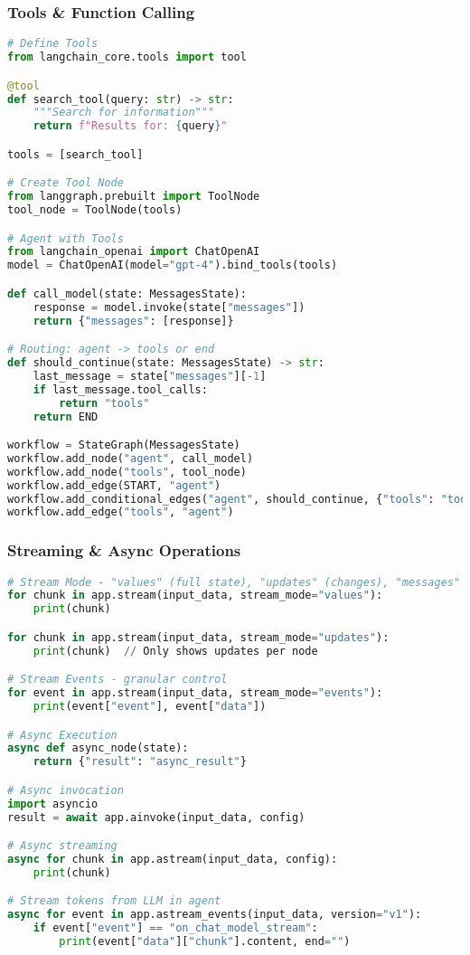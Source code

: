 \begin{frame}[fragile]\frametitle{Tools \& Function Calling}
      \begin{lstlisting}[language=python,basicstyle=\tiny]
# Define Tools
from langchain_core.tools import tool

@tool
def search_tool(query: str) -> str:
    """Search for information"""
    return f"Results for: {query}"

tools = [search_tool]

# Create Tool Node
from langgraph.prebuilt import ToolNode
tool_node = ToolNode(tools)

# Agent with Tools
from langchain_openai import ChatOpenAI
model = ChatOpenAI(model="gpt-4").bind_tools(tools)

def call_model(state: MessagesState):
    response = model.invoke(state["messages"])
    return {"messages": [response]}

# Routing: agent -> tools or end
def should_continue(state: MessagesState) -> str:
    last_message = state["messages"][-1]
    if last_message.tool_calls:
        return "tools"
    return END

workflow = StateGraph(MessagesState)
workflow.add_node("agent", call_model)
workflow.add_node("tools", tool_node)
workflow.add_edge(START, "agent")
workflow.add_conditional_edges("agent", should_continue, {"tools": "tools", END: END})
workflow.add_edge("tools", "agent")
  \end{lstlisting}
\end{frame}

\begin{frame}[fragile]\frametitle{Streaming \& Async Operations}
      \begin{lstlisting}[language=python,basicstyle=\tiny]
# Stream Mode - "values" (full state), "updates" (changes), "messages"
for chunk in app.stream(input_data, stream_mode="values"):
    print(chunk)

for chunk in app.stream(input_data, stream_mode="updates"):
    print(chunk)  // Only shows updates per node

# Stream Events - granular control
for event in app.stream(input_data, stream_mode="events"):
    print(event["event"], event["data"])

# Async Execution
async def async_node(state):
    return {"result": "async_result"}

# Async invocation
import asyncio
result = await app.ainvoke(input_data, config)

# Async streaming
async for chunk in app.astream(input_data, config):
    print(chunk)

# Stream tokens from LLM in agent
async for event in app.astream_events(input_data, version="v1"):
    if event["event"] == "on_chat_model_stream":
        print(event["data"]["chunk"].content, end="")
  \end{lstlisting}
\end{frame}

